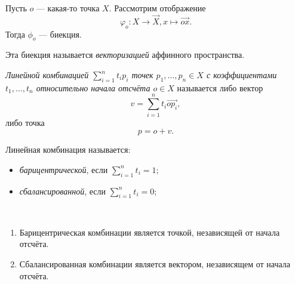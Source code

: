 \documentclass[12pt,a4paper]{article}
\begin{document}
    \begin{lemma}
        Пусть $o$ --- какая-то точка $X$. Рассмотрим отображение
        \[\varphi_o: X \to \overrightarrow{X}, x \mapsto \overrightarrow{ox}.\]
        Тогда $\phi_o$ --- биекция.
    \end{lemma}

    \begin{definition}
        Эта биекция называется \emph{векторизацией} аффинного пространства.
    \end{definition}


    \begin{definition}
        \emph{Линейной комбинацией $\sum_{i=1}^n t_i p_i$ точек $p_1, \dots, p_n \in X$ с коэффициентами $t_1, \dots, t_n$ относительно начала отсчёта $o \in X$} называется либо вектор
        \[v = \sum_{i=1}^n t_i \overrightarrow{op_i},\]
        либо точка
        \[p = o + v.\]

        Линейная комбинация называется:
        \begin{itemize}
            \item \emph{барицентрической}, если $\sum_{i=1}^n t_i = 1$;
            \item \emph{сбалансированной}, если $\sum_{i=1}^n t_i = 0$;
        \end{itemize}
    \end{definition}

    \begin{theorem}\ 
        \begin{enumerate}
            \item Барицентрическая комбинации является точкой, независящей от начала отсчёта.
            \item Сбалансированная комбинации является вектором, независящем от начала отсчёта.
        \end{enumerate}
    \end{theorem}
\end{document}

